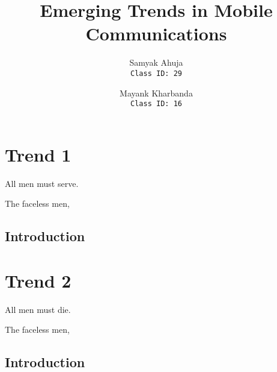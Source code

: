 \documentclass{article}
\title{Emerging Trends in Mobile Communications}
\author{
    Samyak Ahuja \\
    \texttt{Class ID: 29}
    \and
    Mayank Kharbanda \\
    \texttt{Class ID: 16}
}
\begin{document}
\maketitle

\section{Trend 1}
\epigraph{All men must serve.}{The faceless men, \textcite{dance-with-dragons-11}}
\subsection{Introduction}
\lipsum[1-1]

\vspace*{1in}

\section{Trend 2}
\epigraph{All men must die.}{The faceless men, \textcite{dance-with-dragons-11}}
\subsection{Introduction}
\lipsum[1-1]

\printbibliography
\end{document}
